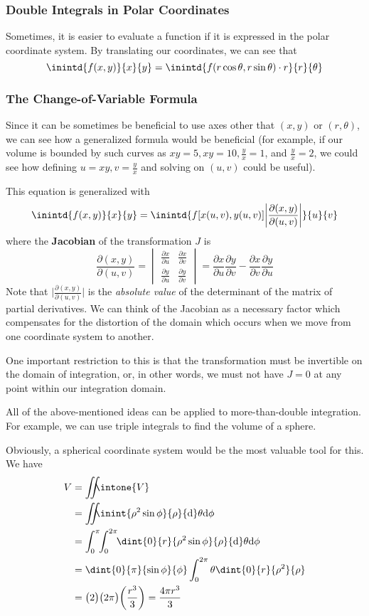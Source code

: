 \documentclass[12pt]{article}
\begin{document}
\subsubsection*{Double Integrals in Polar Coordinates}
Sometimes, it is easier to evaluate a function if it is expressed in the polar coordinate system. By translating our coordinates, we can see that \[ \inintd{f(x,y)}{x}{y} = \inintd{f(r\cos\theta, r\sin\theta)\cdot r}{r}{\theta} \]

\subsubsection*{The Change-of-Variable Formula}
Since it can be sometimes be beneficial to use axes other that $(x,y)$ or $(r,\theta)$, we can see how a generalized formula would be beneficial (for example, if our volume is bounded by such curves as $xy = 5, xy = 10, \frac{y}{x} = 1$, and $\frac{y}{x} = 2$, we could see how defining $u = xy, v = \frac{y}{x}$ and solving on $(u,v)$ could be useful).

This equation is generalized with \[ \inintd{f(x,y)}{x}{y} = \inintd{f[x(u,v),y(u,v)] \bigg|\frac{\partial (x,y)}{\partial (u,v)}\bigg|}{u}{v} \] where the {\bf Jacobian} of the transformation $J$ is \[ \frac{\partial (x,y)}{\partial (u,v)} = \begin{vmatrix}\frac{\partial x}{\partial u} & \frac{\partial x}{\partial v} \\ \frac{\partial y}{\partial u} & \frac{\partial y}{\partial v}\end{vmatrix} = \frac{\partial x}{\partial u}\frac{\partial y}{\partial v} - \frac{\partial x}{\partial v}\frac{\partial y}{\partial u} \] Note that $\bigg|\frac{\partial (x,y)}{\partial (u,v)}\bigg|$ is the \emph{absolute value} of the determinant of the matrix of partial derivatives. We can think of the Jacobian as a necessary factor which compensates for the distortion of the domain which occurs when we move from one coordinate system to another.

One important restriction to this is that the transformation must be invertible on the domain of integration, or, in other words, we must not have $J = 0$ at any point within our integration domain.

All of the above-mentioned ideas can be applied to more-than-double integration. For example, we can use triple integrals to find the volume of a sphere.

Obviously, a spherical coordinate system would be the most valuable tool for this. We have
\begin{align*}
V &= \int\!\!\!\!\int\!\!\!\!\intone{V}\\
  &= \int\!\!\!\!\int\!\!\!\!\inint{\rho^2 \sin\phi}{\rho}{\rm d}\theta{\rm d}\phi\\
  &= \int_0^\pi\!\! \int_0^{2\pi}\!\! \dint{0}{r}{\rho^2 \sin\phi}{\rho}{\rm d}\theta{\rm d}\phi\\
  &= \dint{0}{\pi}{\sin\phi}{\phi} \displaystyle\int_0^{2\pi} \theta \dint{0}{r}{\rho^2}{\rho}\\
  &= \bigl(2\bigl) \bigl(2\pi\bigl) \bigg(\frac{r^3}{3}\bigg) = \frac{4\pi r^3}{3}
\end{align*}
\end{document}
